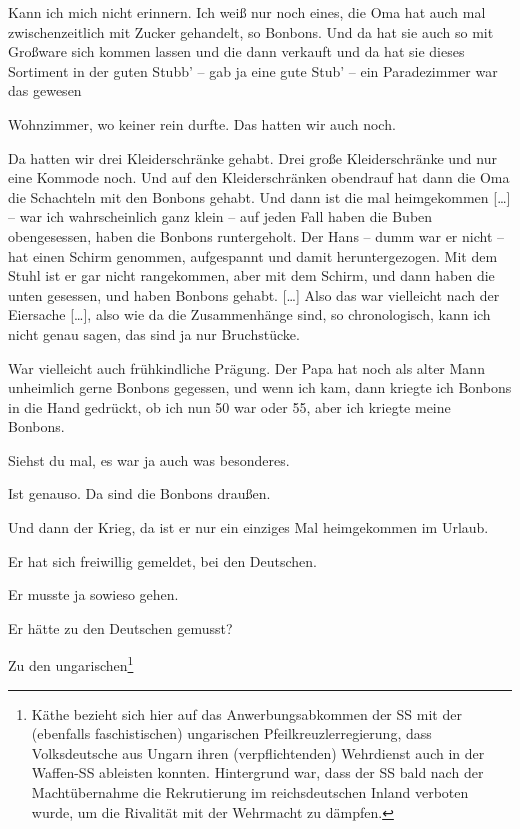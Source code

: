 \documentclass[ngerman,]{article}
\providecommand{\tightlist}{%
  \setlength{\itemsep}{0pt}\setlength{\parskip}{0pt}}
\begin{document}
\begin{multicols}{2}
\begin{description}
\tightlist
\item[Käthe]
Kann ich mich nicht erinnern. Ich weiß nur noch eines, die Oma hat auch
mal zwischenzeitlich mit Zucker gehandelt, so Bonbons. Und da hat sie
auch so mit Großware sich kommen lassen und die dann verkauft und da hat
sie dieses Sortiment in der guten Stubb' – gab ja eine gute Stub' – ein
Paradezimmer war das gewesen
\item[Ruth]
Wohnzimmer, wo keiner rein durfte. Das hatten wir auch noch.
\item[Käthe]
Da hatten wir drei Kleiderschränke gehabt. Drei große Kleiderschränke
und nur eine Kommode noch. Und auf den Kleiderschränken obendrauf hat
dann die Oma die Schachteln mit den Bonbons gehabt. Und dann ist die mal
heimgekommen {[}\ldots{}{]} – war ich wahrscheinlich ganz klein – auf
jeden Fall haben die Buben obengesessen, haben die Bonbons runtergeholt.
Der Hans – dumm war er nicht – hat einen Schirm genommen, aufgespannt
und damit heruntergezogen. Mit dem Stuhl ist er gar nicht rangekommen,
aber mit dem Schirm, und dann haben die unten gesessen, und haben
Bonbons gehabt. {[}\ldots{}{]} Also das war vielleicht nach der
Eiersache {[}\ldots{}{]}, also wie da die Zusammenhänge sind, so
chronologisch, kann ich nicht genau sagen, das sind ja nur Bruchstücke.
\item[Ruth]
War vielleicht auch frühkindliche Prägung. Der Papa hat noch als alter
Mann unheimlich gerne Bonbons gegessen, und wenn ich kam, dann kriegte
ich Bonbons in die Hand gedrückt, ob ich nun 50 war oder 55, aber ich
kriegte meine Bonbons.
\item[Käthe]
Siehst du mal, es war ja auch was besonderes.
\item[Friedrich]
Ist genauso. Da sind die Bonbons draußen.
\item[Käthe]
Und dann der Krieg, da ist er nur ein einziges Mal heimgekommen im
Urlaub.
\item[Ruth]
Er hat sich freiwillig gemeldet, bei den Deutschen.
\item[Käthe]
Er musste ja sowieso gehen.
\item[Ruth]
Er hätte zu den Deutschen gemusst?
\item[Käthe]
Zu den ungarischen\footnote{Käthe bezieht sich hier auf das
  Anwerbungsabkommen der SS mit der (ebenfalls faschistischen)
  ungarischen Pfeilkreuzlerregierung, dass Volksdeutsche aus Ungarn
  ihren (verpflichtenden) Wehrdienst auch in der Waffen-SS ableisten
  konnten. Hintergrund war, dass der SS bald nach der Machtübernahme die
  Rekrutierung im reichsdeutschen Inland verboten wurde, um die
  Rivalität mit der Wehrmacht zu dämpfen.

}
\end{description}
\end{multicols}
\end{document}
